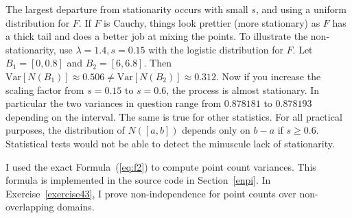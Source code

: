 \documentclass[10pt]{article}
\begin{document}
\begin{Exercise}
The largest departure from  \textcolor{index}{stationarity} occurs with small $s$, and using a uniform distribution for $F$. If $F$ is Cauchy, things look prettier (more stationary) as $F$ has a thick tail and does a better job at mixing the points. To illustrate the non-stationarity,  use $\lambda=1.4, s=0.15$ with the logistic distribution for $F$.
Let $B_1=[0,0.8]$ and $B_2=[6,6.8]$. Then $\mbox{Var}[N(B_1)]\approx0.506 \neq \mbox{Var}[N(B_2)]\approx 0.312$. Now if you increase the scaling factor from
 $s=0.15$ to $s=0.6$, the process is almost stationary. In particular the two variances in question range from $0.878181$ to $0.878193$ depending on the interval. The same is true for other statistics. For all practical purposes, the distribution of $N([a,b])$ depends only on $b-a$ if $s\geq 0.6$. Statistical tests would not be able to detect the minuscule lack of stationarity.

I used the exact Formula~(\ref{eq:f2})
to compute point count variances. This formula is implemented in the source code in Section~\ref{enpi}.
In Exercise~\ref{exercise43}, I prove non-independence for point counts over non-overlapping domains.
\end{Exercise}
\end{document}
